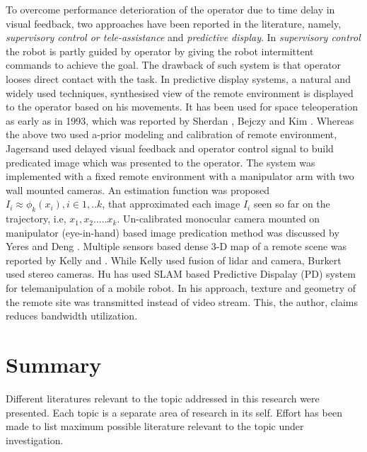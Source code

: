     To overcome performance deterioration of the operator due to time delay in visual feedback, two approaches have been reported in the literature, namely, \textit{supervisory control or tele-assistance  } and \textit{predictive display}. In \textit{supervisory control} \cite{sheridan1986human,pook1994teleassistance,jagersand1995visual} the robot is partly guided by operator by giving the robot intermittent commands to achieve the goal. The drawback of such system is that operator looses direct contact with the task.
    In  predictive display systems, a natural and widely used techniques, synthesised view of the remote environment is displayed to the operator based on his movements. It has been used for space teleoperation as early as in 1993, which was reported by Sherdan \cite{sheridan1993space}, Bejczy \cite{bejczy1990predictive} and Kim \cite{kim1993demonstration}. Whereas the above two used a-prior modeling and  calibration of remote environment, Jagersand \cite{jagersand1999image} used delayed visual feedback and operator control signal to build predicated image which was presented to the operator. The system was implemented with a fixed remote environment with a manipulator arm with  two wall mounted cameras. An estimation function was proposed 
    $I_i \approx \phi_k(x_i), i \in {1,..k}$, that approximated each image  $I_i$ seen so far on the trajectory, i.e, ${x_1, x_2 .....x_k}$. Un-calibrated monocular camera mounted on manipulator (eye-in-hand) based image predication method was discussed   by Yeres \cite{yerex2003predictive} and Deng \cite{deng2003predictive}. Multiple sensors based dense 3-D  map of a remote scene was reported by Kelly \cite{kelly2011real} and \cite{burkert2004photorealistic}. While Kelly used fusion of  lidar and  camera,  Burkert used stereo cameras. Hu \cite{hu2015line} has used SLAM based Predictive Dispalay  (PD) system for telemanipulation of a mobile robot. In his approach, texture and geometry of the remote site was transmitted instead of  video stream. This, the author, claims reduces bandwidth utilization.
    \section{Summary}
    Different literatures relevant to the topic addressed in this research were presented. Each topic is a separate area of research in its self. Effort has been made to list maximum possible literature relevant to the topic under investigation.  

